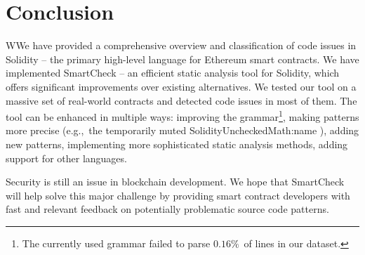 \section{Conclusion}
	
WWe have provided a comprehensive overview and classification of code issues in Solidity -- the primary high-level language for Ethereum smart contracts.
We have implemented SmartCheck -- an efficient static analysis tool for Solidity, which offers significant improvements over existing alternatives.
We tested our tool on a massive set of real-world contracts and detected code issues in most of them.
The tool can be enhanced in multiple ways: improving the grammar\footnote{The currently used grammar failed to parse $0.16\%$~of lines in our dataset.}, making patterns more precise (e.g.,~the temporarily muted {\usevalue SolidityUncheckedMath:name }), adding new patterns, implementing more sophisticated static analysis methods, adding support for other languages.

Security is still an issue in blockchain development.
We hope that SmartCheck will help solve this major challenge by providing smart contract developers with fast and relevant feedback on potentially problematic source code patterns.